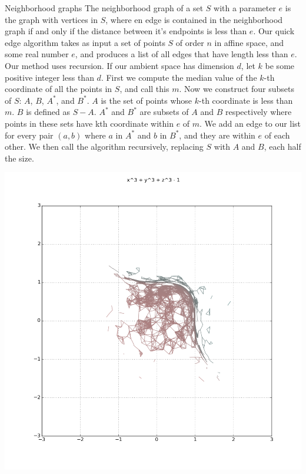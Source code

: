 \documentclass{beamer}
\begin{document}
\begin{frame}{}
\begin{columns}[t]
\begin{column}{0.32\linewidth}
\begin{block}{Neighborhood graphs}
The neighborhood graph of a set $S$ with a parameter $e$ is the graph with vertices in $S$, where en edge is contained in the neighborhood graph if and only if the distance between it's endpoints is less than $e$. Our quick edge algorithm takes as input a set of points $S$ of order $n$ in affine space, and some real number $e$, and produces a list of all edges that have length less than $e$. Our method uses recursion. If our ambient space has dimension $d$, let $k$ be some positive integer less than $d$. 
\newline
\newline
First we compute the median value of the $k$-th coordinate of all the points in $S$, and call this $m$. Now we construct four subsets of $S$: $A$, $B$, $A^*$, and $B^*$. $A$ is the set of points whose $k$-th coordinate is less than $m$. $B$ is defined as $S-A$. $A^*$ and $B^*$ are subsets of $A$ and $B$ respectively where points in these sets have kth coordinate within $e$ of $m$. We add an edge to our list for every pair $(a,b)$ where $a$ in $A^*$ and $b$ in $B^*$, and they are within $e$ of each other. We then call the algorithm recursively, replacing $S$ with $A$ and $B$, each half the size.

\includegraphics[width=1\columnwidth]{plot2d_ng_7}
\end{block}


\end{column}
\end{columns}
\end{frame}
\end{document}
